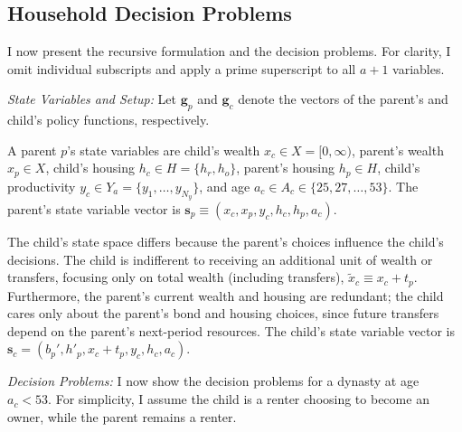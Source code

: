 \documentclass[12pt]{article}
\begin{document}
\subsection{Household Decision Problems}
I now present the recursive formulation and the decision problems. For clarity, I omit individual subscripts and apply a prime superscript to all $a+1$ variables.

\textit{State Variables and Setup:} Let $\mathbf{g}_p$ and $\mathbf{g}_c$ denote the vectors of the parent's and child's policy functions, respectively.

A parent $p$'s state variables are child's wealth $x_c\in X=[0,\infty)$, parent's wealth $x_p\in X$, child's housing $h_c\in H = \{h_r,h_o\}$, parent's housing $h_p\in H$, child's productivity $y_c\in Y_a=\{y_1,\dots,y_{N_y}\}$, and age $a_c\in A_c\in\{25,27,\dots,53\}$. The parent's state variable vector is $\mathbf{s}_p\equiv\left(x_c,x_p,y_c,h_c,h_p,a_c\right)$. 

The child's state space differs because the parent's choices influence the child's decisions. The child is indifferent to receiving an additional unit of wealth or transfers, focusing only on total wealth (including transfers), $\tilde x_c\equiv x_c+t_p$. Furthermore, the parent's current wealth and housing are redundant; the child cares only about the parent's bond and housing choices, since future transfers depend on the parent’s next-period resources.  The child's state variable vector is $\mathbf{s}_c=\left(b_p',h'_p,x_c+t_p,y_c,h_c,a_c\right)$. 




\textit{Decision Problems:} 
I now show the decision problems for a dynasty at age $a_c < 53$. For simplicity, I assume the child is a renter choosing to become an owner, while the parent remains a renter. 
\end{document}
